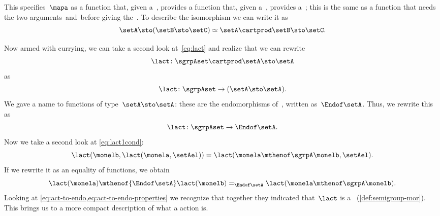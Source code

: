 This specifies~$\mapa$ as a function that, given a~\setA, provides a function that, given a~\setB, provides a~\setC;
this is the same as a function that needs the two arguments~\setA and~\setB before giving the~\setC.
To describe the isomorphism we can write it as
\begin{equation}
    \label{eq:currying-iso-1}
    \setA \sto ( \setB \sto \setC) \simeq  \setA \cartprod \setB \sto \setC.
\end{equation}


Now armed with currying, we can take a second look at~\cref{eq:lact} and realize that we can rewrite
\begin{equation}
    \label{eq:currying-lact-1}
    \lact \colon \sgrpAset \cartprod \setA \sto \setA
\end{equation}
as
\begin{equation}
    \label{eq:currying-lact-2}
    \lact \colon \sgrpAset \to (\setA \sto \setA).
\end{equation}
%
We gave a name to functions of type~$\setA \sto \setA$: these are the endomorphisms of~\setA, written as~$\Endof\setA$.
Thus, we rewrite this as
%
\begin{equation}
    \label{eq:act-to-endo}
    \lact \colon \sgrpAset \to \Endof\setA.
\end{equation}
%
Now we take a second look at \cref{eq:lact1cond}:
%
\begin{equation}
    \label{eq:lact1cond-2}
    \lact(\monelb, \lact(\monela, \setAel)) = \lact(\monela \mthenof\sgrpA \monelb, \setAel).
\end{equation}
%
If we rewrite it as an equality of functions, we obtain
%
\begin{equation}
    \label{eq:act-to-endo-properties}
    \lact(\monela) \mthenof{\Endof\setA}  \lact(\monelb) =_{\Endof\setA} \lact(\monela \mthenof\sgrpA \monelb).
\end{equation}
%
Looking at \cref{eq:act-to-endo,eq:act-to-endo-properties} we recognize that together they indicated that~$\lact$ is a ~(\cref{def:semigroup-mor}).
This brings us to a more compact description of what a  action is.

